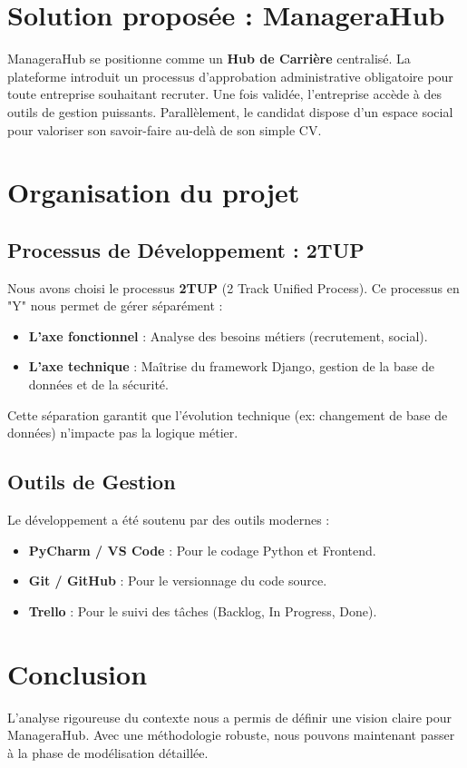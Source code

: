 \documentclass[12pt,a4paper]{report}
\begin{document}
\section{Solution proposée : ManageraHub}
ManageraHub se positionne comme un \textbf{Hub de Carrière} centralisé. La plateforme introduit un processus d'approbation administrative obligatoire pour toute entreprise souhaitant recruter. Une fois validée, l'entreprise accède à des outils de gestion puissants. Parallèlement, le candidat dispose d'un espace social pour valoriser son savoir-faire au-delà de son simple CV.

\section{Organisation du projet}
\subsection{Processus de Développement : 2TUP}
Nous avons choisi le processus \textbf{2TUP} (2 Track Unified Process). Ce processus en "Y" nous permet de gérer séparément :
\begin{itemize}
    \item \textbf{L'axe fonctionnel} : Analyse des besoins métiers (recrutement, social).
    \item \textbf{L'axe technique} : Maîtrise du framework Django, gestion de la base de données et de la sécurité.
\end{itemize}
Cette séparation garantit que l'évolution technique (ex: changement de base de données) n'impacte pas la logique métier.

\subsection{Outils de Gestion}
Le développement a été soutenu par des outils modernes :
\begin{itemize}
    \item \textbf{PyCharm / VS Code} : Pour le codage Python et Frontend.
    \item \textbf{Git / GitHub} : Pour le versionnage du code source.
    \item \textbf{Trello} : Pour le suivi des tâches (Backlog, In Progress, Done).
\end{itemize}

\section{Conclusion}
L'analyse rigoureuse du contexte nous a permis de définir une vision claire pour ManageraHub. Avec une méthodologie robuste, nous pouvons maintenant passer à la phase de modélisation détaillée.
\end{document}
